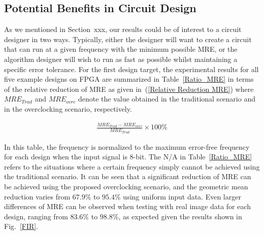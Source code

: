 \documentclass[journal]{IEEEtran}
\begin{document}
\subsection{Potential Benefits in Circuit Design}
As we mentioned in Section~xxx, our results could be of interest to a circuit designer in two ways. Typically, either the designer will want to create a circuit that can run at a given frequency with the minimum possible MRE, or the algorithm designer will wish to run as fast as possible whilst maintaining a specific error tolerance. For the first design target, the experimental results for all five example designs on FPGA are summarized in Table~\ref{Ratio_MRE} in terms of the relative reduction of MRE as given in~(\ref{Relative Reduction MRE}) where $MRE_{Trad}$ and $MRE_{ovrc}$ denote the value obtained in the traditional scenario and in the overclocking scenario, respectively.

\begin{eqnarray}\label{Relative Reduction MRE}
  \frac{MRE_{Trad}-MRE_{ovrc}}{MRE_{Trad}}\times 100\%
\end{eqnarray}

In this table, the frequency is normalized to the maximum error-free frequency for each design when the input signal is 8-bit. The N/A in Table~\ref{Ratio_MRE} refers to the situations where a certain frequency simply cannot be achieved using the traditional scenario. It can be seen that a significant reduction of MRE can be achieved using the proposed overclocking scenario, and the geometric mean reduction varies from $67.9\%$ to $95.4\%$ using uniform input data. Even larger differences of MRE can be observed when testing with real image data for each design, ranging from $83.6\%$ to $98.8\%$, as expected given the results shown in Fig.~\ref{FIR}.
\end{document}
